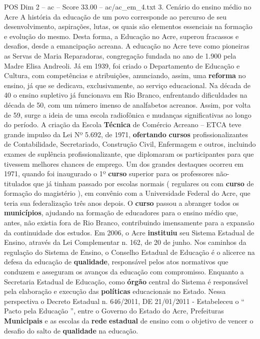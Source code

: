 \begin{textsample}{POS Dim 2 – ac – Score 33.00 – ac/ac\_em\_4.txt}  \label{ex:f2_pos_161}
3.
Cenário do ensino médio no Acre A história da educação de um povo corresponde ao percurso de seu desenvolvimento, aspirações, lutas, os quais são elementos essenciais na formação e evolução do mesmo.
Desta forma, a Educação no Acre, superou fracassos e desafios, desde a emancipação acreana.
A educação no Acre teve como pioneiras as Servas de Maria Reparadoras, congregação fundada no ano de 1.900 pela Madre Elisa Andreoli.
Já em 1939, foi criado o Departamento de Educação e Cultura, com competências e atribuições, anunciando, assim, uma \textbf{reforma} no ensino, já que se dedicava, exclusivamente, ao serviço educacional.
Na década de 40 o ensino supletivo já funcionava em Rio Branco, enfrentando dificuldades na década de 50, com um número imenso de analfabetos acreanos.
Assim, por volta de 59, surge a ideia de uma escola radiofônica e mudanças significativas ao longo do período.
A criação da Escola \textbf{Técnica} de Comércio Acreano – ETCA teve grande impulso da Lei Nº 5.692, de 1971, \textbf{ofertando} \textbf{cursos} profissionalizantes de Contabilidade, Secretariado, Construção Civil, Enfermagem e outros, incluindo exames de suplência profissionalizante, que diplomaram os participantes para que tivessem melhores chances de emprego.
Um dos grandes destaques ocorreu em 1971, quando foi inaugurado o 1º \textbf{curso} superior para os professores não-titulados que já tinham passado por escolas normais ( regulares ou com \textbf{curso} de formação do magistério ), em convênio com a Universidade Federal do Acre, que teria sua federalização três anos depois.
O \textbf{curso} passou a abranger todos os \textbf{municípios}, ajudando na formação de educadores para o ensino médio que, antes, não existia fora de Rio Branco, contribuindo imensamente para a expansão da continuidade dos estudos.
Em 2006, o Acre \textbf{instituiu} seu Sistema Estadual de Ensino, através da Lei Complementar n. 162, de 20 de junho.
Nos caminhos da regulação do Sistema de Ensino, o Conselho Estadual de Educação é o alicerce na defesa da educação de \textbf{qualidade}, responsável pelos atos normativos que conduzem e asseguram os avanços da educação com compromisso.
Enquanto a Secretaria Estadual de Educação, como \textbf{órgão} central do Sistema é responsável pela elaboração e execução das \textbf{políticas} educacionais no Estado.
Nessa perspectiva o Decreto Estadual n. 646/2011, DE 21/01/2011 - Estabeleceu o “ Pacto pela Educação ”, entre o Governo do Estado do Acre, Prefeituras \textbf{Municipais} e as escolas da \textbf{rede} \textbf{estadual} de ensino com o objetivo de vencer o desafio do salto de \textbf{qualidade} na educação.

\end{textsample}
